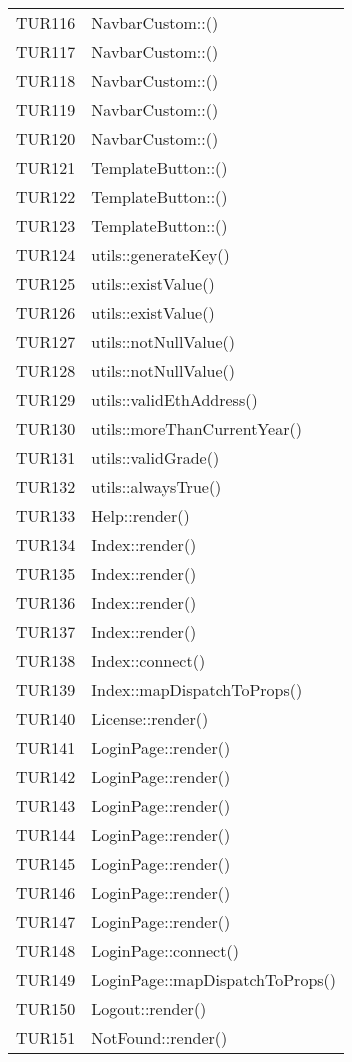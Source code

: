 \documentclass[PianoDiQualifica.tex]{subfiles}
\begin{document}
\begin{longtable}[H]{P{5cm}P{9cm}}
	TUR116 & NavbarCustom::() \\ 
	TUR117 & NavbarCustom::() \\ 
	TUR118 & NavbarCustom::() \\ 
	TUR119 & NavbarCustom::() \\ 
	TUR120 & NavbarCustom::() \\ 
	TUR121 & TemplateButton::() \\ 
	TUR122 & TemplateButton::() \\ 
	TUR123 & TemplateButton::() \\ 
	TUR124 & utils::generateKey() \\ 
	TUR125 & utils::existValue() \\ 
	TUR126 & utils::existValue() \\ 
	TUR127 & utils::notNullValue() \\ 
	TUR128 & utils::notNullValue() \\ 
	TUR129 & utils::validEthAddress() \\ 
	TUR130 & utils::moreThanCurrentYear() \\ 
	TUR131 & utils::validGrade() \\ 
	TUR132 & utils::alwaysTrue() \\ 
	TUR133 & Help::render() \\ 
	TUR134 & Index::render() \\ 
	TUR135 & Index::render() \\ 
	TUR136 & Index::render() \\ 
	TUR137 & Index::render() \\ 
	TUR138 & Index::connect() \\ 
	TUR139 & Index::mapDispatchToProps() \\ 
	TUR140 & License::render() \\ 
	TUR141 & LoginPage::render() \\ 
	TUR142 & LoginPage::render() \\ 
	TUR143 & LoginPage::render() \\ 
	TUR144 & LoginPage::render() \\ 
	TUR145 & LoginPage::render() \\ 
	TUR146 & LoginPage::render() \\ 
	TUR147 & LoginPage::render() \\ 
	TUR148 & LoginPage::connect() \\ 
	TUR149 & LoginPage::mapDispatchToProps() \\ 
	TUR150 & Logout::render() \\ 
	TUR151 & NotFound::render() \\ 

\end{longtable}
\end{document}
